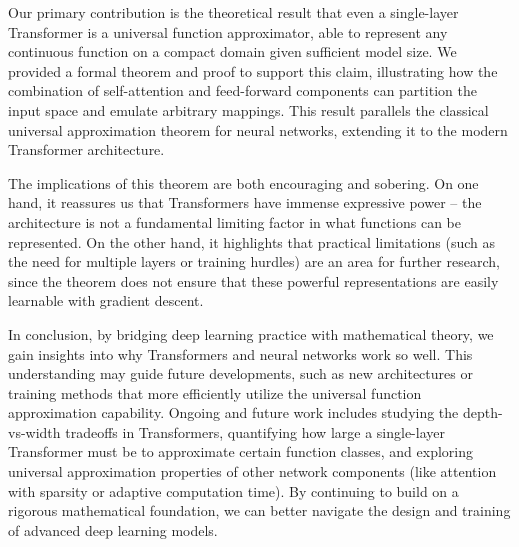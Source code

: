 \documentclass[conference]{IEEEtran}
\begin{document}
Our primary contribution is the theoretical result that even a single-layer Transformer is a universal function approximator, able to represent any continuous function on a compact domain given sufficient model size. We provided a formal theorem and proof to support this claim, illustrating how the combination of self-attention and feed-forward components can partition the input space and emulate arbitrary mappings. This result parallels the classical universal approximation theorem for neural networks, extending it to the modern Transformer architecture.

The implications of this theorem are both encouraging and sobering. On one hand, it reassures us that Transformers have immense expressive power -- the architecture is not a fundamental limiting factor in what functions can be represented. On the other hand, it highlights that practical limitations (such as the need for multiple layers or training hurdles) are an area for further research, since the theorem does not ensure that these powerful representations are easily learnable with gradient descent.

In conclusion, by bridging deep learning practice with mathematical theory, we gain insights into why Transformers and neural networks work so well. This understanding may guide future developments, such as new architectures or training methods that more efficiently utilize the universal function approximation capability. Ongoing and future work includes studying the depth-vs-width tradeoffs in Transformers, quantifying how large a single-layer Transformer must be to approximate certain function classes, and exploring universal approximation properties of other network components (like attention with sparsity or adaptive computation time). By continuing to build on a rigorous mathematical foundation, we can better navigate the design and training of advanced deep learning models.
\end{document}
